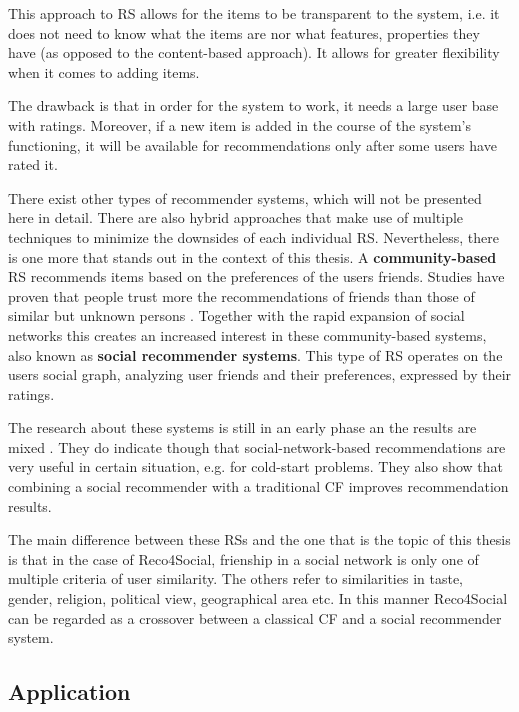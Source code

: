 \documentclass[12pt]{report}
\begin{document}
This approach to RS allows for the items to be transparent to the system, i.e. it does not need to know what the items are nor what features, properties they have (as opposed to the content-based approach). It allows for greater flexibility when it comes to adding items.

The drawback is that in order for the system to work, it needs a large user base with ratings. Moreover, if a new item is added in the course of the system's functioning, it will be available for recommendations only after some users have rated it.

\hbox{}
There exist other types of recommender systems, which will not be presented here in detail. There are also hybrid approaches that make use of multiple techniques to minimize the downsides of each individual RS. 
Nevertheless, there is one more that stands out in the context of this thesis. A {\bf community-based} RS recommends items based on the preferences of the users friends. Studies have proven that people trust more the recommendations of friends than those of similar but unknown persons \cite{sinha}. Together with the rapid expansion of social networks this creates an increased interest in these community-based systems, also known as {\bf social recommender systems}. This type of RS operates on the users social graph, analyzing user friends and their preferences, expressed by their ratings.

The research about these systems is still in an early phase an the results are mixed \cite{rec_sys_handbook}. They do indicate though that social-network-based recommendations are very useful in certain situation, e.g. for cold-start problems. They also show that combining a social recommender with a traditional CF improves recommendation results.

The main difference between these RSs and the one that is the topic of this thesis is that in the case of Reco4Social, frienship in a social network is only one of multiple criteria of user similarity. The others refer to similarities in taste, gender, religion, political view, geographical area etc. In this manner Reco4Social can be regarded as a crossover between a classical CF and a social recommender system.

\subsection{Application}
\end{document}
